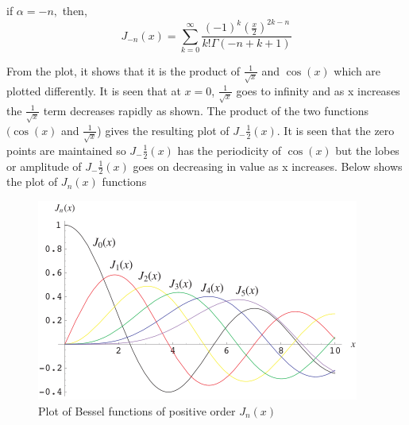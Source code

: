 if $\alpha = -n,$ then,
\begin{equation}
J_{-n}(x) = \sum_{k = 0}^{\infty}\frac{(-1)^k (\frac{x}{2})^{2k - n}}{k! \Gamma(-n + k + 1)}
\label{eqn2}
\end{equation}
\begin{figure}[h]
\centering
{}
\label{fig:fig-1}
\end{figure}
From the plot, it shows that it is the product of $\frac{1}{\sqrt{x}}$ and $\cos(x)$ which are plotted differently. It is seen that at $x=0$, $\frac{1}{\sqrt{x}}$ goes to infinity and as x increases the $\frac{1}{\sqrt{x}}$ term decreases rapidly as shown. The product of the two functions $(\cos(x)$ and $\frac{1}{\sqrt{x}}$) gives the resulting plot of $J_-{\frac{1}{2}}(x)$. It is seen that the zero points are maintained so $J_-{\frac{1}{2}}(x)$ has the periodicity of $\cos(x)$ but the lobes or amplitude of $J_-{\frac{1}{2}}(x)$ goes on decreasing in value as x increases. Below shows the plot of $J_n(x)$ functions
\begin{figure}[h]
\centering
\includegraphics[width=1\linewidth]{./graphics/BesselJ_800}
\caption{Plot of Bessel functions of positive order $J_{n}(x)$}
\label{fig:bessel-functions}
\end{figure}
